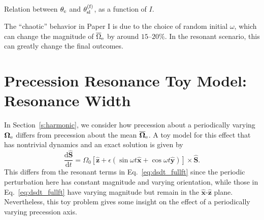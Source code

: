 \documentclass[
        twocolumn,
        twocolappendix
    ]{aastex63}
\newcommand*{\rd}[2]{\frac{\mathrm{d}#1}{\mathrm{d}#2}}
\renewcommand*{\bm}[1]{\boldsymbol{\mathbf{#1}}}
\newcommand*{\uv}[1]{\hat{\bm{#1}}}
\newcommand*{\p}[1]{\left(#1\right)}
\newcommand*{\s}[1]{\left[#1\right]}
\begin{document}
Relation between $\theta_{\rm e}$ and $\theta_{\rm sl}^{\rm (f)}$, as a function
of $I$.

The ``chaotic'' behavior in Paper I is due to the choice of random initial
$\omega$, which can change the magnitude of $\overline{\Omega}_{\rm e}$ by
around $15$--$20\%$. In the resonant scenario, this can greatly change the final
outcomes.




\appendix



\section{Precession Resonance Toy Model: Resonance Width}\label{app:width}

In Section~\ref{s:harmonic}, we consider how precession about a periodically
varying $\bm{\Omega}_{\rm e}$ differs from precession about the mean
$\overline{\bm{\Omega}}_{\rm e}$. A toy model for this effect that has
nontrivial dynamics and an exact solution is given by
\begin{equation}
    \rd{\uv{S}}{t} = \Omega_0 \s{\uv{z} + \epsilon
        \p{\sin \omega t \uv{x} + \cos \omega t \uv{y}}} \times \uv{S}.
        \label{eq:app.toy}
\end{equation}
This differs from the resonant terms in Eq.~\eqref{eq:dsdt_fullft} since the
periodic perturbation here has constant magnitude and varying orientation, while
those in Eq.~\eqref{eq:dsdt_fullft} have varying magnitude but remain in the
$\uv{x}$-$\uv{z}$ plane. Nevertheless, this toy problem gives some insight on
the effect of a periodically varying precession axis.
\end{document}
